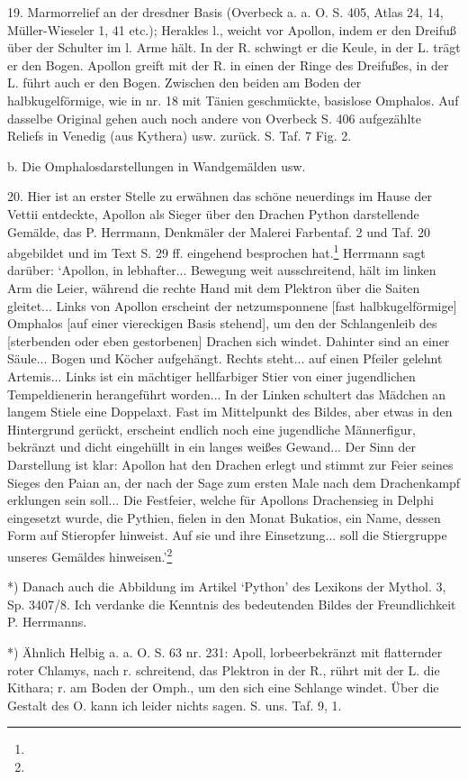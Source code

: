 \documentclass[a4paper, 11pt, oneside]{article}
\begin{document}
19. Marmorrelief an der dresdner Basis (Overbeck a. a. O. S. 405, Atlas 24, 14, Müller-Wieseler 1, 41 etc.); Herakles l., weicht vor Apollon, indem er den Dreifuß über der Schulter im l. Arme hält. In der R. schwingt er die Keule, in der L. trägt er den Bogen. Apollon greift mit der R. in einen der Ringe des Dreifußes, in der L. führt auch er den Bogen. Zwischen den beiden am Boden der halbkugelförmige, wie in nr. 18 mit Tänien geschmückte, basislose Omphalos. Auf dasselbe Original gehen auch noch andere von Overbeck S. 406 aufgezählte Reliefs in Venedig (aus Kythera) usw. zurück. S. Taf. 7 Fig. 2.

b. Die Omphalosdarstellungen in Wandgemälden usw.

20. Hier ist an erster Stelle zu erwähnen das schöne neuerdings im Hause der Vettii entdeckte, Apollon als Sieger über den Drachen Python darstellende Gemälde, das P. Herrmann, Denkmäler der Malerei Farbentaf. 2 und Taf. 20 abgebildet und im Text S. 29 ff. eingehend besprochen hat.\footnote{} Herrmann sagt darüber: `Apollon, in lebhafter... Bewegung weit ausschreitend, hält im linken Arm die Leier, während die rechte Hand mit dem Plektron über die Saiten gleitet... Links von Apollon erscheint der netzumsponnene [fast halbkugelförmige] Omphalos [auf einer viereckigen Basis stehend], um den der Schlangenleib des [sterbenden oder eben gestorbenen] Drachen sich windet. Dahinter sind an einer Säule... Bogen und Köcher aufgehängt. Rechts steht... auf einen Pfeiler gelehnt Artemis... Links ist ein mächtiger hellfarbiger Stier von einer jugendlichen Tempeldienerin herangeführt worden... In der Linken schultert das Mädchen an langem Stiele eine Doppelaxt. Fast im Mittelpunkt des Bildes, aber etwas in den Hintergrund gerückt, erscheint endlich noch eine jugendliche Männerfigur, bekränzt und dicht eingehüllt in ein langes weißes Gewand... Der Sinn der Darstellung ist klar: Apollon hat den Drachen erlegt und stimmt zur Feier seines Sieges den Paian an, der nach der Sage zum ersten Male nach dem Drachenkampf erklungen sein soll... Die Festfeier, welche für Apollons Drachensieg in Delphi eingesetzt wurde, die Pythien, fielen in den Monat Bukatios, ein Name, dessen Form auf Stieropfer hinweist. Auf sie und ihre Einsetzung... soll die Stiergruppe unseres Gemäldes hinweisen.'\footnote{}

*) Danach auch die Abbildung im Artikel `Python' des Lexikons der Mythol. 3, Sp. 3407/8. Ich verdanke die Kenntnis des bedeutenden Bildes der Freundlichkeit P. Herrmanns.

*) Ähnlich Helbig a. a. O. S. 63 nr. 231: Apoll, lorbeerbekränzt mit flatternder roter Chlamys, nach r. schreitend, das Plektron in der R., rührt mit der L. die Kithara; r. am Boden der Omph., um den sich eine Schlange windet. Über die Gestalt des O. kann ich leider nichts sagen. S. uns. Taf. 9, 1.
\end{document}

